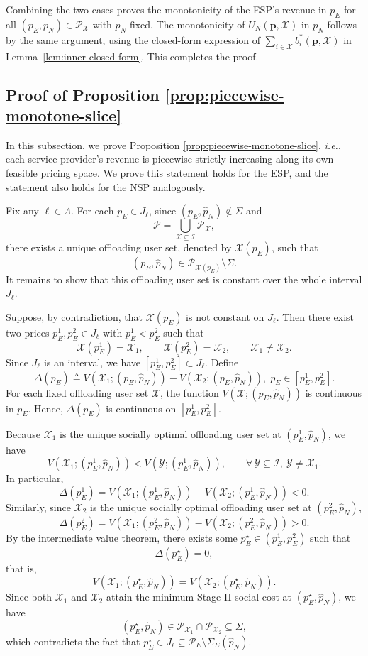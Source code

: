 \documentclass[lettersize,journal]{IEEEtran}
\newcommand{\ie}{\emph{i.e.}}
\begin{document}
Combining the two cases proves the monotonicity of the ESP's revenue in $p_E$ for all $(p_E,p_N)\in\mathcal{P}_{\mathcal{X}}$ with $p_N$ fixed.
The monotonicity of $U_N(\boldsymbol{p},\mathcal{X})$ in $p_N$ follows by the same argument, using the closed-form expression of
$\sum_{i\in\mathcal{X}} b_i^*(\boldsymbol{p},\mathcal{X})$ in Lemma~\ref{lem:inner-closed-form}. This completes the proof.

\subsection{Proof of Proposition \ref{prop:piecewise-monotone-slice}}\label{proof:piecewise-monotone-slice}
In this subsection, we prove Proposition \ref{prop:piecewise-monotone-slice}, \ie, each service provider's revenue is piecewise strictly increasing along its own feasible pricing space. We prove this statement holds for the ESP, and the statement also holds for the NSP analogously.

Fix any $\ell\in\Lambda$.
For each $p_E\in J_\ell$, since $(p_E,\hat p_N)\notin \Sigma$ and
\[
\mathcal P=\bigcup_{\mathcal X\subseteq\mathcal I}\mathcal P_{\mathcal X},
\]
there exists a unique offloading user set, denoted by $\mathcal X(p_E)$, such that
\[
(p_E,\hat p_N)\in \mathcal P_{\mathcal X(p_E)}\setminus \Sigma.
\]
It remains to show that this offloading user set is constant over the whole interval $J_\ell$.

Suppose, by contradiction, that $\mathcal X(p_E)$ is not constant on $J_\ell$.
Then there exist two prices $p_E^1,p_E^2\in J_\ell$ with $p_E^1<p_E^2$ such that
\[
\mathcal X(p_E^1)=\mathcal X_1,\qquad
\mathcal X(p_E^2)=\mathcal X_2,
\qquad
\mathcal X_1\neq \mathcal X_2.
\]
Since $J_\ell$ is an interval, we have $[p_E^1,p_E^2]\subset J_\ell$.
Define
\[
\Delta(p_E)
\triangleq
V(\mathcal X_1;(p_E,\hat p_N))
-
V(\mathcal X_2;(p_E,\hat p_N)),
\; p_E\in [p_E^1,p_E^2].
\]
For each fixed offloading user set $\mathcal X$, the function
$V(\mathcal X;(p_E,\hat p_N))$ is continuous in $p_E$.
Hence, $\Delta(p_E)$ is continuous on $[p_E^1,p_E^2]$.

Because $\mathcal X_1$ is the unique socially optimal offloading user set at $(p_E^1,\hat p_N)$, we have
\[
V(\mathcal X_1;(p_E^1,\hat p_N))
<
V(\mathcal Y;(p_E^1,\hat p_N)),
\qquad
\forall\, \mathcal Y\subseteq\mathcal I,\ \mathcal Y\neq \mathcal X_1.
\]
In particular,
\[
\Delta(p_E^1)
=
V(\mathcal X_1;(p_E^1,\hat p_N))
-
V(\mathcal X_2;(p_E^1,\hat p_N))
<0.
\]
Similarly, since $\mathcal X_2$ is the unique socially optimal offloading user set at $(p_E^2,\hat p_N)$,
\[
\Delta(p_E^2)
=
V(\mathcal X_1;(p_E^2,\hat p_N))
-
V(\mathcal X_2;(p_E^2,\hat p_N))
>0.
\]
By the intermediate value theorem, there exists some $p_E^\star\in (p_E^1,p_E^2)$ such that
\[
\Delta(p_E^\star)=0,
\]
that is,
\[
V(\mathcal X_1;(p_E^\star,\hat p_N))
=
V(\mathcal X_2;(p_E^\star,\hat p_N)).
\]
Since both $\mathcal X_1$ and $\mathcal X_2$ attain the minimum Stage-II social cost at $(p_E^\star,\hat p_N)$, we have
\[
(p_E^\star,\hat p_N)\in \mathcal P_{\mathcal X_1}\cap \mathcal P_{\mathcal X_2}\subseteq \Sigma,
\]
which contradicts the fact that $p_E^\star\in J_\ell\subseteq \mathcal P_E\setminus \Sigma_E(\hat p_N)$.
\end{document}
